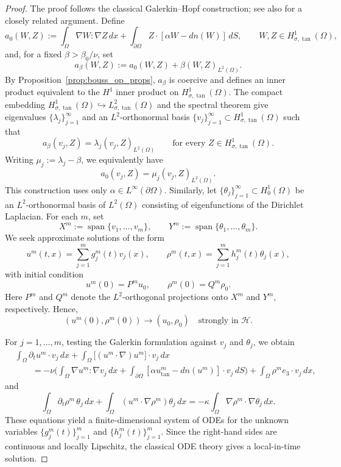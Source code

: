 \documentclass[11pt,reqno]{amsart}
\theoremstyle{plain}
\numberwithin{equation}{section}
\newcommand{\tanproj}{\text{tan}}
\begin{document}
\begin{proof}
The proof follows the classical Galerkin--Hopf construction; see also \cite{Kelliher2025} for a closely related argument. Define
\[
a_0(W,Z)
:=\int_\Omega\nabla W:\nabla Z\,dx
+\int_{\partial\Omega}Z\cdot[\alpha W-dn(W)]\,dS,
\qquad W,Z\in H^1_{\sigma,\tan}(\Omega),
\]
and, for a fixed $\beta>\beta_0/\nu$, set
\[
a_\beta(W,Z):=a_0(W,Z)+\beta(W,Z)_{L^2(\Omega)}.
\]
By Proposition~\ref{prop:bouss_op_props}, $a_\beta$ is coercive and defines an inner product equivalent to the $H^1$ inner product on $H^1_{\sigma,\tan}(\Omega)$. The compact embedding $H^1_{\sigma,\tan}(\Omega)\hookrightarrow L^2_{\sigma,\tan}(\Omega)$ and the spectral theorem give eigenvalues $\{\lambda_j\}_{j=1}^\infty$ and an $L^2$-orthonormal basis $\{v_j\}_{j=1}^\infty\subset H^1_{\sigma,\tan}(\Omega)$ such that
\[
a_\beta(v_j,Z)=\lambda_j(v_j,Z)_{L^2(\Omega)}
\qquad\text{for every }Z\in H^1_{\sigma,\tan}(\Omega).
\]
Writing $\mu_j:=\lambda_j-\beta$, we equivalently have
\[
a_0(v_j,Z)=\mu_j(v_j,Z)_{L^2(\Omega)}.
\]
This construction uses only $\alpha\in L^\infty(\partial\Omega)$. Similarly, let $\{\theta_j\}_{j=1}^\infty\subset H^1_0(\Omega)$ be an $L^2$-orthonormal basis of $L^2(\Omega)$ consisting of eigenfunctions of the Dirichlet Laplacian. For each $m$, set 
\[
X^m:=\operatorname{span}\{v_1,\dots,v_m\},
\qquad
Y^m:=\operatorname{span}\{\theta_1,\dots,\theta_m\}.
\]
We seek approximate solutions of the form
\[
u^m(t,x)=\sum_{j=1}^m g_j^m(t)v_j(x),
\qquad
\rho^m(t,x)=\sum_{j=1}^m h_j^m(t)\theta_j(x),
\]
with initial condition
\[
u^m(0)=P^m u_0,
\qquad
\rho^m(0)=Q^m\rho_0.
\]
Here $P^m$ and $Q^m$ denote the $L^2$-orthogonal projections onto $X^m$ and $Y^m$, respectively. Hence,
\[
(u^m(0),\rho^m(0))\to (u_0,\rho_0)\quad\text{strongly in }\mathcal H.
\]

\par\smallskip
For $j=1,\ldots,m$, testing the Galerkin formulation against $v_j$ and $\theta_j$, we obtain
\begin{equation}
    \begin{split}
        &\int_{\Omega}\partial_t u^m \cdot v_j\,dx
        +\int_{\Omega}\big[(u^m\cdot \nabla)u^m\big]\cdot v_j\,dx\\
        &\qquad=-\nu\bigg(\int_\Omega \nabla u^m:\nabla v_j\,dx+\int_{\partial\Omega}
        [\alpha u^m_{\tanproj}-dn(u^m)]\cdot v_j\,dS
        \bigg)+\int_\Omega \rho^m e_3\cdot v_j\,dx ,
    \end{split}
    \label{galerkin-u}
\end{equation}
and
\begin{equation}
\int_{\Omega}\partial_t \rho^m\,\theta_j\,dx+\int_{\Omega}(u^m\cdot\nabla\rho^m)\theta_j\,dx=-\kappa\int_\Omega\nabla\rho^m\cdot\nabla\theta_j\,dx.\label{galerkin-rho}
    \end{equation}
These equations yield a finite-dimensional system of ODEs for the unknown variables $\{g_j^m(t)\}_{j=1}^m$ and $\{h_j^m(t)\}_{j=1}^m$. Since the right-hand sides are continuous and locally Lipschitz, the classical ODE theory gives a local-in-time solution.


\end{proof}
\end{document}
